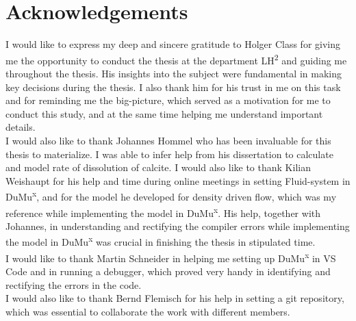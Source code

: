 \chapter*{Acknowledgements}
\thispagestyle{empty}
I would like to express my deep and sincere gratitude to Holger Class for giving me the opportunity to conduct the thesis at the department LH\textsuperscript{2} and guiding me throughout the thesis. His insights into the subject were fundamental in making key decisions during the thesis. I also thank him for his trust in me on this task and for reminding me the big-picture, which served as a motivation for me to conduct this study, and at the same time helping me understand important details. \\

I would also like to thank Johannes Hommel who has been invaluable for this thesis to materialize. I was able to infer help from his dissertation to calculate and model rate of dissolution of calcite. I would also like to thank Kilian Weishaupt for his help and time during online meetings in setting Fluid-system in DuMu\textsuperscript{x}, and for the model he developed for density driven flow, which was my reference while implementing the model in DuMu\textsuperscript{x}. His help, together with Johannes, in understanding and rectifying the compiler errors while implementing the model in DuMu\textsuperscript{x} was crucial in finishing the thesis in stipulated time.\\

I would like to thank Martin Schneider in helping me setting up DuMu\textsuperscript{x} in VS Code and in running a debugger, which proved very handy in identifying and rectifying the errors in the code. \\
I would also like to thank Bernd Flemisch for his help in setting a git repository, which was essential to collaborate the work with different members.
\endinput
